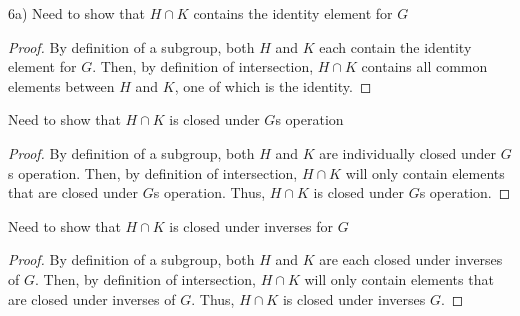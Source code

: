 \documentclass[executivepaper]{article}
\begin{document}
\begin{flushleft}

6a) Need to show that $H \cap K$ contains the identity element for $G$

\begin{center}

\begin{proof}

By definition of a subgroup, both $H$ and $K$ each contain the identity element for $G$. Then, by definition of intersection, $H \cap K$ contains all common elements between $H$ and $K$, one of which is the identity.

\end{proof}

\end{center}

Need to show that $H \cap K$ is closed under $G$\textsc{}s operation

\begin{center}

\begin{proof}

By definition of a subgroup, both $H$ and $K$ are individually closed under $G$\textsc{}s operation. Then, by definition of intersection, $H \cap K$ will only contain elements that are closed under $G$\textsc{}s operation. Thus, $H \cap K$ is closed under $G$\textsc{}s operation.

\end{proof}

\end{center}

Need to show that $H \cap K$ is closed under inverses for $G$

\begin{center}

\begin{proof}

By definition of a subgroup, both $H$ and $K$ are each closed under inverses of $G$. Then, by definition of intersection, $H \cap K$ will only contain elements that are closed under inverses of $G$. Thus, $H \cap K$ is closed under inverses $G$.

\end{proof}

\end{center}

\end{flushleft}
\end{document}
